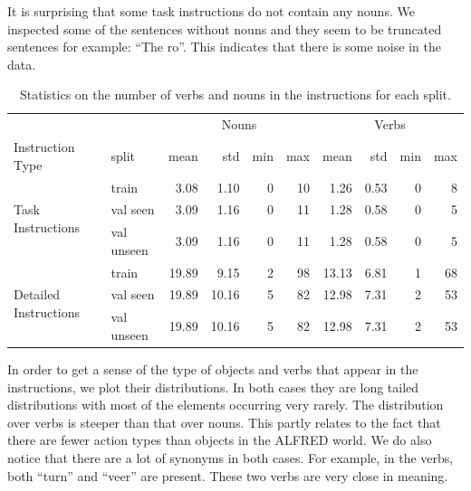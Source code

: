 \documentclass[11pt,a4paper]{article}
\begin{document}
It is surprising that some task instructions do not contain any nouns. We inspected some of the sentences without nouns and they seem to be truncated sentences for example: ``The ro''. This indicates that there is some noise in the data.


\begin{table}[]
    \centering
\begin{tabular}{llrrrr|rrrr}
\toprule
        & & \multicolumn{4}{c|}{Nouns} & \multicolumn{4}{c}{Verbs}\\
    Instruction Type & split &  mean &  std &  min &  max &  mean &  std &  min &  max \\
\midrule
\multirow{3}{*}{Task Instructions}
&      train &  3.08 & 1.10 &    0 &   10 &  1.26 & 0.53 &    0 &    8 \\
&   val seen &  3.09 & 1.16 &    0 &   11 &  1.28 & 0.58 &    0 &    5 \\
& val unseen &  3.09 & 1.16 &    0 &   11 &  1.28 & 0.58 &    0 &    5 \\
\midrule
\multirow{3}{*}{Detailed Instructions}
&      train & 19.89 &  9.15 &    2 &   98 & 13.13 & 6.81 &    1 &   68 \\
&   val seen & 19.89 & 10.16 &    5 &   82  & 12.98 & 7.31 &    2 &   53 \\
& val unseen & 19.89 & 10.16 &    5 &   82  & 12.98 & 7.31 &    2 &   53 \\
\bottomrule
\end{tabular}
    \caption{Statistics on the number of verbs and nouns in the instructions for each split.}
    \label{tab:verbs_nouns_stats}
\end{table}

In order to get a sense of the type of objects and verbs that appear in the instructions, we plot their distributions. In both cases they are long tailed distributions with most of the elements occurring very rarely. The distribution over verbs is steeper than that over nouns. This partly relates to the fact that there are fewer action types than objects in the ALFRED world. We do also notice that there are a lot of synonyms in both cases. For example, in the verbs, both ``turn'' and ``veer'' are present. These two verbs are very close in meaning.
\end{document}
